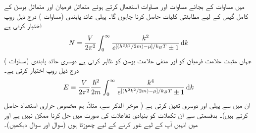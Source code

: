 میں مساوات  کے بجائے مساوات  اور مساوات  استعمال کرتے ہوئے متماثل فرمیان اور متماثل بوسن کے کامل گیس کے لیے مطابقتی کلیات حاصل کرنا چاہوں گا۔ پہلی عائد پابندی (مساوات ) درج ذیل روپ اختیار کرتی ہے 
\begin{align}\label{مساوات_متماثل_فرمیان_تعداد_تکمل}
N = \frac{V}{2 \pi^2} \int_0^{\infty} \frac{k^2}{e^{[(h^2 k^2 /2m) - \mu] / k_B T} \pm 1} \dif k
\end{align}
جہاں مثبت علامت فرمیان کو اور منفی علامت بوسن کو ظاہر کرتی ہے دوسری عائد پابندی (مساوات  ) درج ذیل روپ اختیار کرتی ہے۔
\begin{align}\label{مساوات_متماثل_فرمیان_توانائی_تکمل}
E = \frac{V}{2\pi^2} \frac{\hslash^2}{2m} \int_0^{\infty} \frac{k^4}{e^{[(h^2 k^2 /2m) - \mu] / k_B T} \pm 1} \dif k
\end{align}
ان میں سے پہلی  اور دوسری  تعین کرتی ہے ( موخر الذکر سے، مثلاً، ہم مخصوص حراری استعداد  حاصل کرتے ہیں)۔ بدقسمتی سے ان تکملات کو بنیادی تفاعلات کی صورت میں حل کرنا ممکن نہیں ہے اور میں انہیں آپ کے لیے غور کرنے کے لیے چھوڑتا ہوں (سوال  اور سوال  دیکھیں)۔ 


